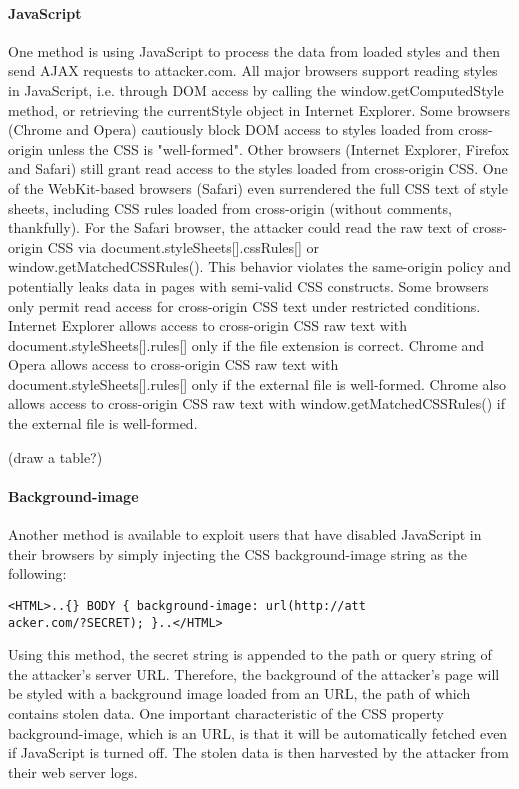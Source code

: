 \documentclass{acm_proc_article-sp}
\begin{document}
\paragraph{JavaScript}
One method is using JavaScript to process the data from loaded styles and then send AJAX requests to attacker.com. All major browsers support reading styles in JavaScript, i.e. through DOM access by calling the window.getComputedStyle method, or retrieving the currentStyle object in Internet Explorer. Some browsers (Chrome and Opera) cautiously block DOM access to styles loaded from cross-origin unless the CSS is "well-formed". Other browsers (Internet Explorer, Firefox and Safari) still grant read access to the styles loaded from cross-origin CSS. One of the WebKit-based browsers (Safari) even surrendered the full CSS text of style sheets, including CSS rules loaded from cross-origin (without comments, thankfully). For the Safari browser, the attacker could read the raw text of cross-origin CSS via document.styleSheets[].cssRules[] or window.getMatchedCSSRules(). This behavior violates the same-origin policy and potentially leaks data in pages with semi-valid CSS constructs. Some browsers only permit read access for cross-origin CSS text under restricted conditions. Internet Explorer allows access to cross-origin CSS raw text with document.styleSheets[].rules[] only if the file extension is correct. Chrome and Opera allows access to cross-origin CSS raw text with document.styleSheets[].rules[] only if the external file is well-formed. Chrome also allows access to cross-origin CSS raw text with window.getMatchedCSSRules() if the external file is well-formed.

(draw a table?)

\paragraph{Background-image}
Another method is available to exploit users that have disabled JavaScript in their browsers by simply injecting the CSS background-image string as the following:
\begin{verbatim}
<HTML>..{} BODY { background-image: url(http://att
acker.com/?SECRET); }..</HTML>
\end{verbatim}
Using this method, the secret string is appended to the path or query string of the attacker's server URL. Therefore, the background of the attacker's page will be styled with a background image loaded from an URL, the path of which contains stolen data. One important characteristic of the CSS property background-image, which is an URL, is that it will be automatically fetched even if JavaScript is turned off. The stolen data is then harvested by the attacker from their web server logs.
\end{document}
